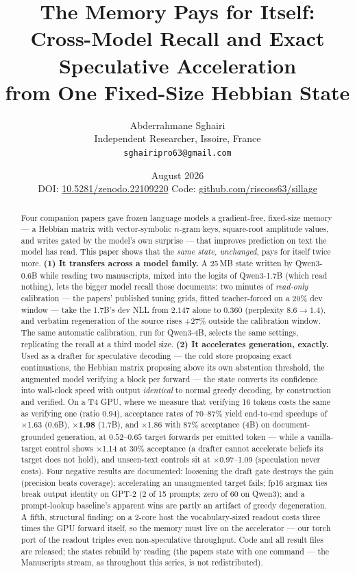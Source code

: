 \documentclass[11pt]{article}
\title{\bfseries The Memory Pays for Itself:\\
Cross-Model Recall and Exact Speculative Acceleration\\
from One Fixed-Size Hebbian State}
\author{Abderrahmane Sghairi\\
\small Independent Researcher, Issoire, France\\
\small \texttt{sghairipro63@gmail.com}}
\date{August 2026\\[2pt]
\small DOI: \href{https://doi.org/10.5281/zenodo.22109220}{10.5281/zenodo.22109220}
\qquad Code: \href{https://github.com/riscoss63/sillage}{github.com/riscoss63/sillage}}
\begin{document}
\maketitle

\begin{abstract}
Four companion papers gave frozen language models a gradient-free, fixed-size memory --- a Hebbian matrix with vector-symbolic $n$-gram keys, square-root amplitude values, and writes gated by the model's own surprise --- that improves prediction on text the model has read. This paper shows that the \emph{same state, unchanged}, pays for itself twice more. \textbf{(1) It transfers across a model family.} A 25\,MB state written by Qwen3-0.6B while reading two manuscripts, mixed into the logits of Qwen3-1.7B (which read nothing), lets the bigger model recall those documents: two minutes of \emph{read-only} calibration --- the papers' published tuning grids, fitted teacher-forced on a 20\% dev window --- take the 1.7B's dev NLL from $2.147$ alone to $0.360$ (perplexity $8.6 \to 1.4$), and verbatim regeneration of the source rises $+27\%$ outside the calibration window. The same automatic calibration, run for Qwen3-4B, selects the same settings, replicating the recall at a third model size. \textbf{(2) It accelerates generation, exactly.} Used as a drafter for speculative decoding --- the cold store proposing exact continuations, the Hebbian matrix proposing above its own abstention threshold, the augmented model verifying a block per forward --- the state converts its confidence into wall-clock speed with output \emph{identical} to normal greedy decoding, by construction and verified. On a T4 GPU, where we measure that verifying 16 tokens costs the same as verifying one (ratio $0.94$), acceptance rates of 70--87\% yield end-to-end speedups of $\times$1.63 (0.6B), $\times$\textbf{1.98} (1.7B), and $\times$1.86 with 87\% acceptance (4B) on document-grounded generation, at $0.52$--$0.65$ target forwards per emitted token --- while a vanilla-target control shows $\times$1.14 at 30\% acceptance (a drafter cannot accelerate beliefs its target does not hold), and unseen-text controls sit at $\times$0.97--1.09 (speculation never costs). Four negative results are documented: loosening the draft gate destroys the gain (precision beats coverage); accelerating an unaugmented target fails; fp16 argmax ties break output identity on GPT-2 (2 of 15 prompts; zero of 60 on Qwen3); and a prompt-lookup baseline's apparent wins are partly an artifact of greedy degeneration. A fifth, structural finding: on a 2-core host the vocabulary-sized readout costs three times the GPU forward itself, so the memory must live on the accelerator --- our torch port of the readout triples even non-speculative throughput. Code and all result files are released; the states rebuild by reading (the papers state with one command --- the Manuscripts stream, as throughout this series, is not redistributed).
\end{abstract}
\end{document}
